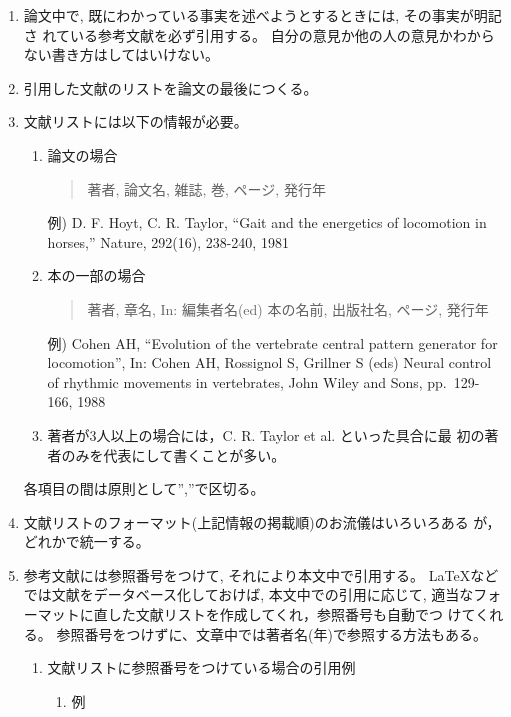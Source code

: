 \documentclass[12pt, ]{jsarticle}
\begin{document}
\begin{enumerate}
\item
  論文中で, 既にわかっている事実を述べようとするときには,
  その事実が明記さ れている参考文献を必ず引用する。
  自分の意見か他の人の意見かわからない書き方はしてはいけない。
\item
  引用した文献のリストを論文の最後につくる。
\item
  文献リストには以下の情報が必要。

  \begin{enumerate}
  \item
    論文の場合

    \begin{quote}
    著者, 論文名, 雑誌, 巻, ページ, 発行年
    \end{quote}

    例) D. F. Hoyt, C. R. Taylor, ``Gait and the energetics of
    locomotion in horses,'' Nature, 292(16), 238-240, 1981
  \item
    本の一部の場合

    \begin{quote}
    著者, 章名, In: 編集者名(ed) 本の名前, 出版社名, ページ, 発行年
    \end{quote}

    例) Cohen AH, ``Evolution of the vertebrate central pattern
    generator for locomotion'', In: Cohen AH, Rossignol S, Grillner S
    (eds) Neural control of rhythmic movements in vertebrates, John
    Wiley and Sons, pp.~129-166, 1988
  \item
    著者が3人以上の場合には，C. R. Taylor et al. といった具合に最
    初の著者のみを代表にして書くことが多い。
  \end{enumerate}

  各項目の間は原則として'',''で区切る。
\item
  文献リストのフォーマット(上記情報の掲載順)のお流儀はいろいろある
  が，どれかで統一する。
\item
  参考文献には参照番号をつけて, それにより本文中で引用する。
  LaTeXなどでは文献をデータベース化しておけば, 本文中での引用に応じて,
  適当なフォーマットに直した文献リストを作成してくれ，参照番号も自動でつ
  けてくれる。
  参照番号をつけずに、文章中では著者名(年)で参照する方法もある。

  \begin{enumerate}
  \item
    文献リストに参照番号をつけている場合の引用例

    \begin{enumerate}
    \item
      例


\end{enumerate}
\end{enumerate}
\end{enumerate}
\end{document}
